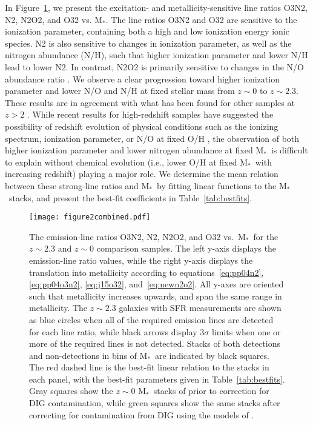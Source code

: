 \documentclass[iop,twocolappendix]{emulateapj}
\newcommand{\mstar}{$\mbox{M}_*$}
\begin{document}
In Figure~\ref{fig2}, we present the excitation- and
 metallicity-sensitive line ratios O3N2, N2, N2O2, and O32 vs. \mstar.  The line ratios
 O3N2 and O32 are sensitive to the ionization parameter, containing both a high and low ionization
 energy ionic species.  N2 is also sensitive to changes in ionization parameter, as well as the
 nitrogen abundance (N/H), such that higher ionization parameter and lower N/H lead to lower N2.
  In contrast, N2O2 is primarily sensitive to changes in the N/O abundance ratio \citep{kew02}.
  We observe a clear progression toward higher ionization parameter
 and lower N/O and N/H at fixed stellar mass from $z\sim0$ to $z\sim2.3$.  These results are in
 agreement with what has been found for other samples at $z>2$ \citep[e.g.,][]{erb06,ste14,sha15,hol16}.
  While recent results for high-redshift samples have suggested the possibility of redshift evolution
 of physical conditions such as the ionizing spectrum, ionization parameter, or N/O at fixed O/H
 \citep[e.g.,][]{kew13,mas14,mas16,ste14,ste16,sha15,san16a,str17},
 the observation of both higher ionization parameter and lower
 nitrogen abundance at fixed \mstar\ is difficult to explain without chemical evolution
 (i.e., lower O/H at fixed \mstar\ with increasing redshift) playing a major role.
  We determine the mean relation between these strong-line ratios and \mstar\ by fitting
 linear functions to the \mstar\ stacks, and present the best-fit coefficients in
 Table~\ref{tab:bestfits}.

\begin{figure}
 \texttt{[image: figure2combined.pdf]}
 \centering
 \caption{The emission-line ratios O3N2, N2, N2O2, and O32 vs.~\mstar\ for the $z\sim2.3$ and $z\sim0$ comparison
 samples.  The left y-axis displays the emission-line ratio values, while the right y-axis displays the
 translation into metallicity according to equations~\ref{eq:pp04n2}, \ref{eq:pp04o3n2}, \ref{eq:j15o32},
 and~\ref{eq:newn2o2}.  All y-axes are oriented such that metallicity increases upwards, and span the same
 range in metallicity.  The $z\sim2.3$ galaxies with SFR measurements are shown as blue circles when all
 of the required emission lines are detected for each line ratio, while black arrows display $3\sigma$ limits
 when one or more of the required lines is not detected.  Stacks of both detections and non-detections in bins
 of \mstar\ are indicated by black squares.  The red dashed line is the best-fit linear relation to the stacks
 in each panel, with the best-fit parameters given in Table~\ref{tab:bestfits}.
  Gray squares show the $z\sim0$ \mstar\ stacks of \citet{and13} prior to correction for DIG contamination,
 while green squares show the same stacks after correcting for contamination from DIG using the models of
 \citet{san17}.
}\label{fig2}
\end{figure}
 
\end{document}
